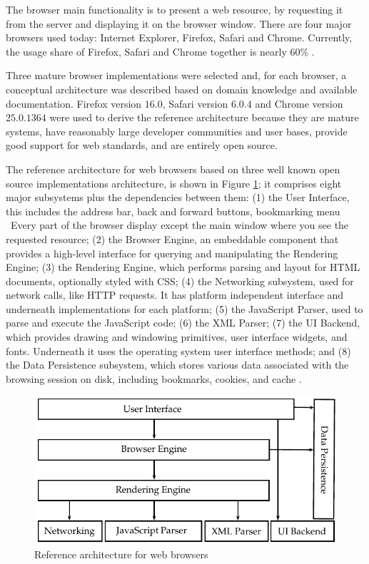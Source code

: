 The browser main functionality is to present a web resource, by requesting it from the server and displaying it on the browser window. There are four major browsers used today: Internet Explorer, Firefox, Safari and Chrome. Currently, the usage share of Firefox, Safari and Chrome together is nearly 60\% \cite{Traffic2013}.

Three mature browser implementations were selected and, for each browser, a conceptual architecture was described based on domain knowledge and available documentation. Firefox version $16.0$, Safari version $6.0.4$ and Chrome version $25.0.1364$ were used to derive the reference architecture because they are mature systems, have reasonably large developer communities and user bases, provide good support for web standards, and are entirely open source.

The reference architecture for web browsers based on three well known open source implementations architecture, is shown in Figure \ref{figure:web_architecture}; it comprises eight major subsystems plus the dependencies between them: (1) the User Interface, this includes the address bar, back and forward buttons, bookmarking menu \etc\ Every part of the browser display except the main window where you see the requested resource; (2) the Browser Engine, an embeddable component that provides a high-level interface for querying and manipulating the Rendering Engine; (3) the Rendering Engine, which performs parsing and layout for HTML documents, optionally styled with CSS; (4) the Networking subsystem, used for network calls, like HTTP requests. It has platform independent interface and underneath implementations for each platform; (5) the JavaScript Parser, used to parse and execute the JavaScript code; (6) the XML Parser; (7) the UI Backend, which provides drawing and windowing primitives, user interface widgets, and fonts. Underneath it uses the operating system user interface methods; and (8) the Data Persistence subsystem, which stores various data associated with the browsing session on disk, including bookmarks, cookies, and cache \cite{Grosskurth2005}.

\begin{figure}[!htb]
  \centering
  \includegraphics{chapters/basic_concepts/web_architecture.pdf}
  \caption{Reference architecture for web browsers}
  \label{figure:web_architecture}
\end{figure}

